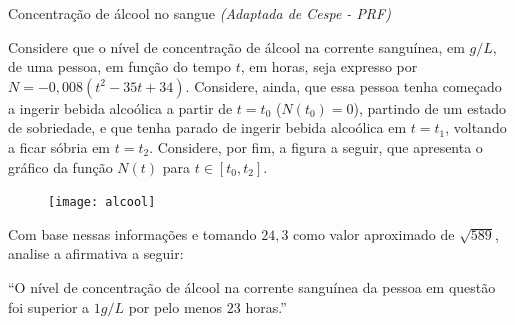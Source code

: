 \begin{task}{Concentração de álcool no sangue}
\textit{(Adaptada de Cespe - PRF)}

Considere que o nível de concentração de álcool na corrente sanguínea, em $g/L$, de uma pessoa, em função do tempo $t$, em horas, seja expresso por $N =-0{,}008(t^2 - 35t + 34)$. Considere, ainda, que essa pessoa tenha começado a ingerir bebida alcoólica a partir de $t = t_0$ ($N(t_0) = 0$), partindo de um estado de sobriedade, e que tenha parado de ingerir bebida alcoólica em $t = t_1$, voltando a ficar sóbria em $t = t_2$. Considere, por fim, a figura a seguir, que apresenta o gráfico da função $N(t)$ para $t \in [t_0, t_2]$. 


\begin{figure}[H]
\centering
\noindent\texttt{[image: alcool]}
\end{figure}

Com base nessas informações e tomando $24{,}3$ como valor aproximado de $\sqrt{589}$, analise a afirmativa a seguir:

“O nível de concentração de álcool na corrente sanguínea da pessoa em questão foi superior a $1 g/L$ por pelo menos $23$ horas.”
\end{task}

